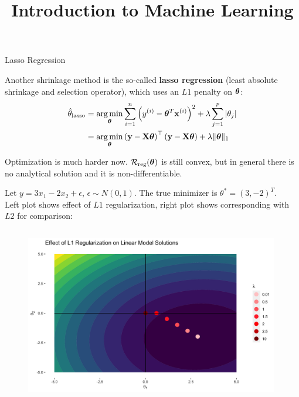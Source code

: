 \documentclass[11pt,compress,t,notes=noshow, xcolor=table]{beamer}
\title{Introduction to Machine Learning}
\date{}
\begin{document}


\begin{vbframe}{Lasso Regression}

Another shrinkage method is the so-called \textbf{lasso regression} ({\scriptsize{least absolute shrinkage and selection operator}}), which uses an $L1$ penalty on $\bm{\theta}$:
\vspace{0.4cm}
\begin{align*}
\hat{\theta}_{\text{lasso}}&= \operatorname*{arg\,min}_{\bm{\theta}} \sum\limits_{i=1}^n \left(y^{(i)} - \bm{\theta}^T \mathbf{x}^{(i)}\right)^2 + \lambda \sum_{j=1}^{p} \vert\theta_j\vert\\
&= \operatorname*{arg\,min}_{\bm{\theta}}\left(\mathbf{y} - \mathbf{X} \bm{\theta}\right)^\top \left(\mathbf{y} - \mathbf{X} \bm{\theta}\right) + \lambda \|\bm{\theta}\|_1
\end{align*}

\vspace{0.4cm}

Optimization is much harder now. $\mathcal{R}_{\text{reg}}(\bm{\theta})$ is still convex, but in general there is no analytical solution and it is non-differentiable.\\
\vspace{0.2cm}


\framebreak

Let $y=3x_{1} -2x_{2} +\epsilon $, $ \epsilon \sim N( 0,1)$. The true minimizer is $\theta ^{*} =( 3,-2)^{T}$. \\
\vspace{0.1cm}
Left plot shows effect of $L1$ regularization, right plot shows corresponding with $L2$ for comparison:
\begin{columns}
\begin{column}{0.5\textwidth}
\lz
\begin{figure}
\includegraphics[width=0.99\textwidth]{figure/lin_reg_l1.png}
\end{figure}
\end{column}


\end{columns}
\end{vbframe}
\end{document}
